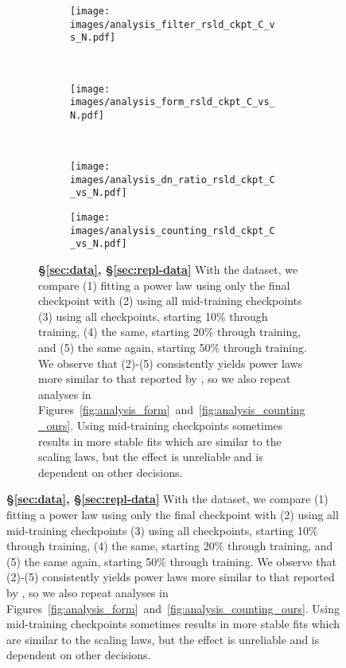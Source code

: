 \begin{figure}[]
\ContinuedFloat
\centering 

\begin{subfigure}{\textwidth}
\centering 
\begin{subfigure}{0.7\textwidth}
    \centering
    \texttt{[image: images/analysis\_filter\_rsld\_ckpt\_C\_vs\_N.pdf]}
\end{subfigure}
\\ \vspace{1em}
\begin{subfigure}{0.49\textwidth}
    \centering
    \texttt{[image: images/analysis\_form\_rsld\_ckpt\_C\_vs\_N.pdf]}
\end{subfigure}
\hfill
\begin{subfigure}{0.49\textwidth}
    \centering
\end{subfigure}
\\ \vspace{1em}
\begin{subfigure}{0.49\textwidth}
    \centering
    \texttt{[image: images/analysis\_dn\_ratio\_rsld\_ckpt\_C\_vs\_N.pdf]}
\end{subfigure}
\hfill
\begin{subfigure}{0.49\textwidth}
    \centering
    \texttt{[image: images/analysis\_counting\_rsld\_ckpt\_C\_vs\_N.pdf]}
\end{subfigure}



\caption{
\textbf{\S\ref{sec:data}, \S\ref{sec:repl-data}} With the \citet{porian2024resolving} dataset, we compare (1) fitting a power law using only the final checkpoint with (2) using all mid-training checkpoints (3) using all checkpoints, starting 10\% through training, (4) the same, starting 20\% through training, and (5) the same again, starting 50\% through training. We observe that (2)-(5) consistently yields power laws more similar to that reported by \citet{hoffmann2022training}, so we also repeat analyses in Figures~\ref{fig:analysis_form}~and~\ref{fig:analysis_counting_ours}. Using mid-training checkpoints sometimes results in more stable fits which are similar to the \citet{hoffmann2022training} scaling laws, but the effect is unreliable and is dependent on other decisions. 
}
\label{fig:analysis_checkpoint_rsld}        
\end{subfigure}

\end{figure}
